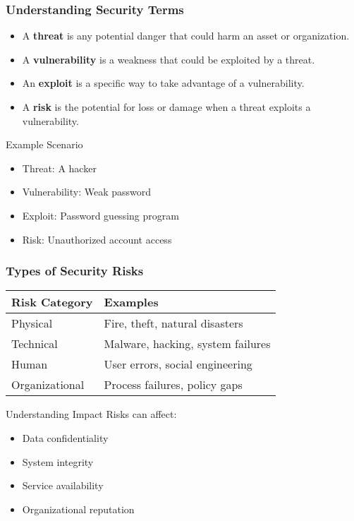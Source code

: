 \documentclass{beamer}
\begin{document}
\begin{frame}
    \frametitle{Understanding Security Terms}
    
    \begin{itemize}
        \item A \textbf{threat} is any potential danger that could harm an asset or organization.
        
        \item A \textbf{vulnerability} is a weakness that could be exploited by a threat.
        
        \item An \textbf{exploit} is a specific way to take advantage of a vulnerability.
        
        \item A \textbf{risk} is the potential for loss or damage when a threat exploits a vulnerability.
    \end{itemize}
    
    \begin{exampleblock}{Example Scenario}
        \begin{itemize}
            \item Threat: A hacker
            \item Vulnerability: Weak password
            \item Exploit: Password guessing program
            \item Risk: Unauthorized account access
        \end{itemize}
    \end{exampleblock}
\end{frame}

\begin{frame}
    \frametitle{Types of Security Risks}
    
    \begin{table}
        \begin{tabular}{|l|l|}
            \hline
            \textbf{Risk Category} & \textbf{Examples} \\
            \hline
            Physical & Fire, theft, natural disasters \\
            Technical & Malware, hacking, system failures \\
            Human & User errors, social engineering \\
            Organizational & Process failures, policy gaps \\
            \hline
        \end{tabular}
    \end{table}
    
    \begin{block}{Understanding Impact}
        Risks can affect:
        \begin{itemize}
            \item Data confidentiality
            \item System integrity
            \item Service availability
            \item Organizational reputation
        \end{itemize}
    \end{block}
\end{frame}
\end{document}
